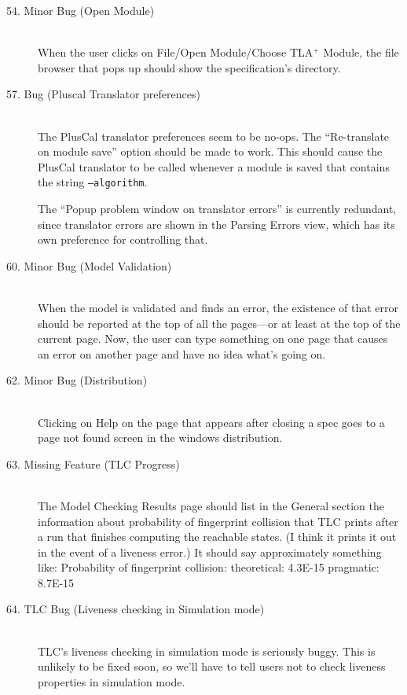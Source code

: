 \documentclass{article}
\newcommand{\TLA}[1]{TLA$^{+}$}
\begin{document}
\begin{description}
\item[54. Minor Bug (Open Module)] \mbox{}\\
%
When the user clicks on File/Open Module/Choose \TLA+ Module, the file
browser that pops up should show the specification's directory.

\item[57. Bug (Pluscal Translator preferences)] \mbox{}\\
%
The PlusCal translator preferences seem to be no-ops.  The
``Re-translate on module save'' option should be made to work.  This
should cause the PlusCal translator to be called whenever a module is
saved that contains the string \texttt{--algorithm}.

The ``Popup problem window on translator errors'' is currently
redundant, since translator errors are shown in the Parsing
Errors view, which has its own preference for controlling that.
    
\item[60. Minor Bug (Model Validation)] \mbox{}\\
%
When the model is validated and finds an error, the existence of that
error should be reported at the top of all the pages---or at least at
the top of the current page.  Now, the user can type something on one
page that causes an error on another page and have no idea what's
going on.

\item[62. Minor Bug (Distribution)] \mbox{}\\
%
	Clicking on Help on the page that appears after closing a
spec 	goes to a page not found screen in the windows distribution.

\item[63. Missing Feature (TLC Progress)] \mbox{}\\
%
The Model Checking Results page should list in the General section the
information about probability of fingerprint collision that TLC prints
after a run that finishes computing the reachable states.  (I think it
prints it out in the event of a liveness error.)  It should say
approximately something like:
  Probability of fingerprint collision:
     theoretical: 4.3E-15  pragmatic: 8.7E-15

\item[64. TLC Bug (Liveness checking in Simulation mode)] \mbox{}\\
%
TLC's liveness checking in simulation mode is seriously buggy.  
This is unlikely to be fixed soon, so we'll
have to tell users not to check liveness properties in simulation
mode.  


\end{description}
\end{document}

